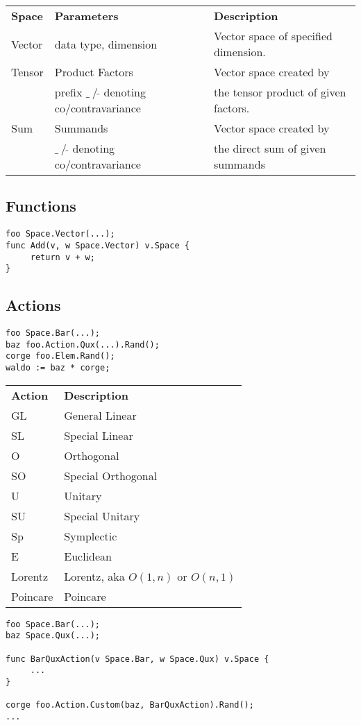 \documentclass{amsbook}
\begin{document}
\begin{tabular}{lll}
  \textbf{Space} & \textbf{Parameters} & \textbf{Description} \\
  Vector & data type, dimension & Vector space of specified dimension.\\
  Tensor & Product Factors & Vector space created by \\
  & prefix $\_~/~\hat{}$  denoting co/contravariance & the tensor product of given factors.\\
  Sum & Summands & Vector space created by \\
   & $\_~/~\hat{}$  denoting co/contravariance & the direct sum of given summands\\
\end{tabular}

\subsection{Functions}

\begin{verbatim}
foo Space.Vector(...);
func Add(v, w Space.Vector) v.Space {
     return v + w;
}
\end{verbatim}

\subsection{Actions}

\begin{verbatim}
foo Space.Bar(...);
baz foo.Action.Qux(...).Rand();
corge foo.Elem.Rand();
waldo := baz * corge;
\end{verbatim}


\begin{tabular}{ll}
  \textbf{Action} & \textbf{Description} \\
  GL & General Linear \\
  SL & Special Linear \\
  O  & Orthogonal \\
  SO & Special Orthogonal \\
  U  & Unitary \\
  SU & Special Unitary \\
  Sp & Symplectic \\
  E  & Euclidean \\
  Lorentz & Lorentz, aka $O(1, n)$ or $O(n, 1)$ \\
  Poincare & Poincare \\
\end{tabular}


\begin{verbatim}
foo Space.Bar(...);
baz Space.Qux(...);

func BarQuxAction(v Space.Bar, w Space.Qux) v.Space {
     ...
}

corge foo.Action.Custom(baz, BarQuxAction).Rand();
...
\end{verbatim}
\end{document}
